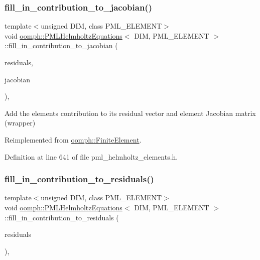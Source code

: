 \subsubsection{\texorpdfstring{fill\+\_\+in\+\_\+contribution\+\_\+to\+\_\+jacobian()}{fill\_in\_contribution\_to\_jacobian()}}
{\footnotesize\ttfamily template$<$unsigned D\+IM, class P\+M\+L\+\_\+\+E\+L\+E\+M\+E\+NT$>$ \\
void \hyperlink{classoomph_1_1PMLHelmholtzEquations}{oomph\+::\+P\+M\+L\+Helmholtz\+Equations}$<$ D\+IM, P\+M\+L\+\_\+\+E\+L\+E\+M\+E\+NT $>$\+::fill\+\_\+in\+\_\+contribution\+\_\+to\+\_\+jacobian (\begin{DoxyParamCaption}\item[{\hyperlink{classoomph_1_1Vector}{Vector}$<$ double $>$ \&}]{residuals,  }\item[{\hyperlink{classoomph_1_1DenseMatrix}{Dense\+Matrix}$<$ double $>$ \&}]{jacobian }\end{DoxyParamCaption})\hspace{0.3cm}{\ttfamily [inline]}, {\ttfamily [virtual]}}



Add the element\textquotesingle{}s contribution to its residual vector and element Jacobian matrix (wrapper) 



Reimplemented from \hyperlink{classoomph_1_1FiniteElement_a0ae7af222af38a0d53bf283dc85bdfea}{oomph\+::\+Finite\+Element}.



Definition at line 641 of file pml\+\_\+helmholtz\+\_\+elements.\+h.

\mbox{\label{classoomph_1_1PMLHelmholtzEquations_a4dec73b82e1218743faf077447a1b48d}} 
\subsubsection{\texorpdfstring{fill\+\_\+in\+\_\+contribution\+\_\+to\+\_\+residuals()}{fill\_in\_contribution\_to\_residuals()}}
{\footnotesize\ttfamily template$<$unsigned D\+IM, class P\+M\+L\+\_\+\+E\+L\+E\+M\+E\+NT$>$ \\
void \hyperlink{classoomph_1_1PMLHelmholtzEquations}{oomph\+::\+P\+M\+L\+Helmholtz\+Equations}$<$ D\+IM, P\+M\+L\+\_\+\+E\+L\+E\+M\+E\+NT $>$\+::fill\+\_\+in\+\_\+contribution\+\_\+to\+\_\+residuals (\begin{DoxyParamCaption}\item[{\hyperlink{classoomph_1_1Vector}{Vector}$<$ double $>$ \&}]{residuals }\end{DoxyParamCaption})\hspace{0.3cm}{\ttfamily [inline]}, {\ttfamily [virtual]}}



